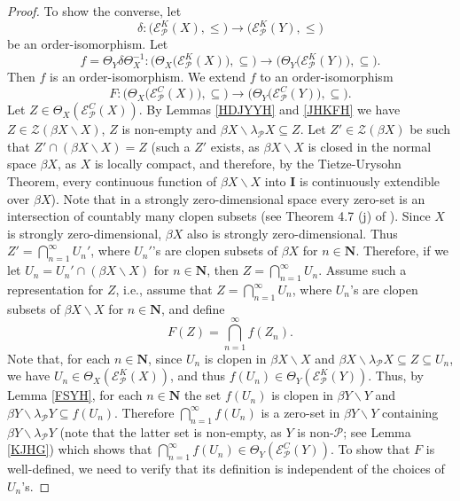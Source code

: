 \documentclass{amsart}
\theoremstyle{definition}
\theoremstyle{remark}
\theoremstyle{notation}
\numberwithin{equation}{section}
\begin{document}
\begin{proof}
To show the converse, let
\[\delta:\big({\mathscr E}^K_{{\mathcal P}}(X),\leq\big)\rightarrow\big({\mathscr E}^K_{{\mathcal P}}(Y),\leq\big)\]
be an order-isomorphism.  Let
\[f=\Theta_Y\delta\Theta_X^{-1}:\big(\Theta_X\big({\mathscr E}^K_{{\mathcal P}}(X)\big),\subseteq\big)\rightarrow\big(\Theta_Y\big({\mathscr E}^K_{{\mathcal P}}(Y)\big),\subseteq\big).\]
Then $f$ is an order-isomorphism. We extend $f$ to an order-isomorphism
\[F:\big(\Theta_X\big({\mathscr E}^C_{{\mathcal P}}(X)\big),\subseteq\big)\rightarrow\big(\Theta_Y\big({\mathscr E}^C_{{\mathcal P}}(Y)\big),\subseteq\big).\]
Let $Z\in \Theta_X({\mathscr E}^C_{{\mathcal P}}(X))$. By Lemmas \ref{HDJYYH} and \ref{JHKFH} we have  $Z\in {\mathscr Z}(\beta X\backslash X)$, $Z$ is non-empty
and  $\beta X\backslash\lambda_{{\mathcal P}} X\subseteq Z$. Let  $Z'\in {\mathscr Z}(\beta X)$ be such that $Z'\cap(\beta X\backslash X)=Z$ (such a $Z'$ exists, as $\beta X\backslash X$ is closed in the normal space $\beta X$, as $X$ is locally compact, and therefore, by the Tietze-Urysohn Theorem,
every continuous function of
$\beta X\backslash X$ into $\mathbf{I}$ is continuously extendible over $\beta X$). Note that  in a strongly zero-dimensional space every zero-set is an intersection of countably many  clopen subsets (see Theorem 4.7 (j) of \cite{PW}). Since $X$  is strongly zero-dimensional, $\beta X$ also is
strongly zero-dimensional. Thus $Z'=\bigcap_{n=1}^\infty U_n'$, where $U_n'$'s are clopen subsets of $\beta X$ for $n\in \mathbf{N}$. Therefore, if we let  $U_n=U_n'\cap(\beta X\backslash X)$ for $n\in \mathbf{N}$, then  $Z=\bigcap_{n=1}^\infty U_n$. Assume such a representation for $Z$, i.e., assume that
$Z=\bigcap_{n=1}^\infty U_n$, where $U_n$'s are clopen subsets of $\beta X\backslash X$ for $n\in \mathbf{N}$, and define
\[F(Z)=\bigcap_{n=1}^\infty f(Z_n).\]
Note that, for each $n\in \mathbf{N}$,  since $U_n$ is clopen in $\beta X\backslash X$ and
$\beta X\backslash\lambda_{{\mathcal P}} X\subseteq Z\subseteq U_n$, we have $U_n\in \Theta_X({\mathscr E}^K_{{\mathcal P}}(X))$, and thus
$f(U_n)\in \Theta_Y({\mathscr E}^K_{{\mathcal P}}(Y))$.  Thus, by  Lemma \ref{FSYH}, for each $n\in \mathbf{N}$ the set $f(U_n)$ is  clopen in $\beta Y\backslash Y$
and $\beta Y\backslash\lambda_{{\mathcal P}} Y\subseteq f(U_n)$. Therefore
$\bigcap_{n=1}^\infty f(U_n)$ is a zero-set in $\beta Y\backslash Y$  containing
$\beta Y\backslash\lambda_{{\mathcal P}} Y$ (note that the latter set is non-empty, as $Y$ is  non-${\mathcal P}$; see Lemma \ref{KJHG})
which shows that $\bigcap_{n=1}^\infty f(U_n)\in \Theta_Y({\mathscr E}^C_{{\mathcal P}}(Y))$.
To show that $F$ is well-defined, we need to verify that its definition is independent of the choices of $U_n$'s.


\end{proof}
\end{document}
